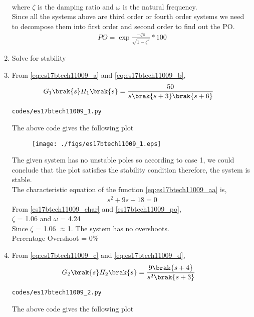 \begin{enumerate}[label=\thesection.\arabic*.,ref=\thesection.\theenumi]
\begin{align}
\label{es17btech11009_char}
\end{align}
where $\zeta$ is the damping ratio and $\omega$ is the natural frequency.
\\
Since all the systems above are third order or fourth order systems we need to decompose them into first order and second order to find out the PO.
\begin{align}
PO = \exp{\frac{-\zeta \pi}{\sqrt{1- \zeta^2}}} * 100
\label{es17btech11009_po}
\end{align}
\item Solve for stability
\item
\solution From \eqref{eq:es17btech11009_a} and \eqref{eq:es17btech11009_b},
\begin{align}
G_1\brak{s}H_1\brak{s}&= \frac{50}{s\brak{s+3}\brak{s+6}}
\label{eq:es17btech11009_aa}
\end{align}
\begin{lstlisting}
codes/es17btech11009_1.py
\end{lstlisting}
The above code gives the following plot
\begin{figure}[!h]
\centering
\texttt{[image: ./figs/es17btech11009\_1.eps]}
\caption{}
\label{fig:es17btech11009_fig1}
\end{figure}
The given system has no unstable poles so according to case 1, we could conclude that the plot satisfies the stability condition therefore, the system is stable.
\\
The characteristic equation of the function \eqref{eq:es17btech11009_aa} is,
\begin{align}
 s^2 + 9s + 18 = 0
 \end{align}
From \eqref{es17btech11009_char} and \eqref{es17btech11009_po},
\\
 $\zeta$ = 1.06 and $\omega$ = 4.24
 \\
 Since $\zeta$ = 1.06 $\approx$1.
 The system has no overshoots.
\\ 
Percentage Overshoot = 0\%
\item
From \eqref{eq:es17btech11009_c} and \eqref{eq:es17btech11009_d},
\begin{align}
G_2\brak{s}H_2\brak{s}&= \frac{9\brak{s+4}}{s^2\brak{s+3}}
\label{eq:es17btech11009_bb}
\end{align}
\begin{lstlisting}
codes/es17btech11009_2.py
\end{lstlisting}
The above code gives the following plot
\begin{figure}[!h]

\end{figure}
\end{enumerate}

